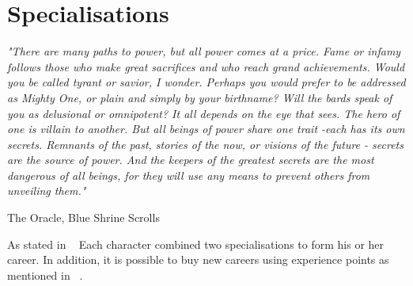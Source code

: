 





%

%



%




%


%



\chapter{Specialisations}\label{chap:specs}

\epigraph{\textit{
"There are many paths to power, but all power comes at a price. Fame or infamy follows those who make great sacrifices
and who reach grand achievements. Would you be called tyrant or savior, I wonder. Perhaps you would prefer to be
addressed as Mighty One, or plain and simply by your birthname? Will the bards speak of you as delusional or
omnipotent? It all depends on the eye that sees. The hero of one is villain to another. But all beings of power share one
trait -each has its own secrets. Remnants of the past, stories of the now, or visions of the future - secrets are the source of
power. And the keepers of the greatest secrets are the most dangerous of all beings, for they will use any means to prevent
others from unveiling them." } } { The Oracle, Blue Shrine Scrolls }

As stated in ~ Each character combined two specialisations to form his or her career. In addition, it is
possible to buy new careers using experience points as mentioned in ~.

\begin{multicols}{2}

\ambassadorDescription
\arcanaDescription
\archerDescription
\assassinDescription
\beastRiderDescription
\gameHunterDescription
\charmerDescription
\duneTraderDescription
\gladiatorDescription
\mercenaryDescription
\performerDescription
\doctorDescription
\primalDescription
\psionDescription
\scholarDescription
\scoutDescription
\thiefDescription
\thugDescription

\end{multicols}

